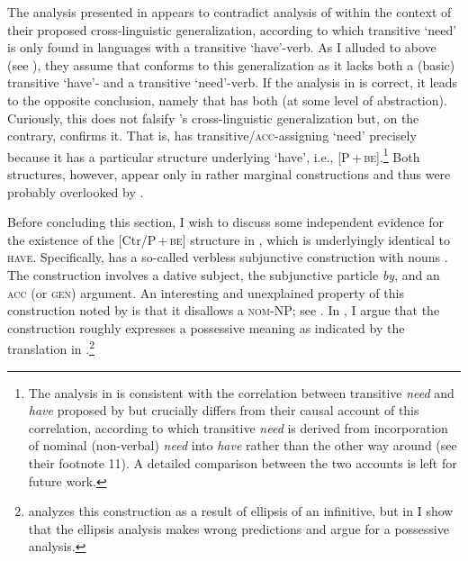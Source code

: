 \documentclass[output=paper]{langscibook}
\begin{document}
The analysis presented in  appears to contradict  analysis of  within the context of their proposed cross-linguistic generalization, according to which transitive `need' is only found in languages with a transitive `have'-verb. As I alluded to above (see ), they assume that  conforms to this generalization as it lacks both a (basic) transitive `have'- and a transitive `need'-verb. If the analysis in  is correct, it leads to the opposite conclusion, namely that  has both (at some level of abstraction). Curiously, this does not falsify \citeauthor{Harves.Kayne2012}'s cross-linguistic generalization but, on the contrary, confirms it. That is,  has transitive/\textsc{acc}-assigning `need' precisely because it has a particular structure underlying `have', i.e., [P\,+\,\textsc{be}].\footnote{The analysis in  is consistent with the correlation between transitive \textit{need} and \textit{have} proposed by \citet{Harves.Kayne2012} but crucially differs from their causal account of this correlation, according to which transitive \textit{need} is derived from incorporation of nominal (non-verbal) \textit{need} into \textit{have} rather than the other way around (see their footnote 11). A detailed comparison between the two accounts is left for future work.} Both structures, however, appear only in rather marginal constructions and thus were probably overlooked by \citet{Harves.Kayne2012}.

Before concluding this section, I wish to discuss some independent evidence for the existence of the [Ctr/P\,+\,\textsc{be}] structure in , which is underlyingly identical to \textsc{have}. Specifically,  has a so-called verbless subjunctive construction with nouns \citep[see][]{Dobrushina2015}. The construction involves a dative subject, the subjunctive particle \textit{by}, and an \textsc{acc} (or \textsc{gen}) argument. An interesting and unexplained property of this construction noted by \citet{Dobrushina2015} is that it disallows a \textsc{nom}-NP; see . In \citet{Knyazev2020}, I argue that the construction roughly expresses a possessive meaning as indicated by the translation in .\footnote{\citet{Dobrushina2015} analyzes this construction as a result of ellipsis of an infinitive, but in \citet{Knyazev2020} I show that the ellipsis analysis makes wrong predictions and argue for a possessive analysis.}
\end{document}
